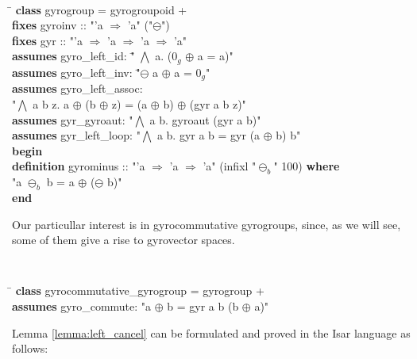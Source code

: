 \documentclass[a4paper]{article}
\newcommand{\tab}{\hspace{5mm}}
\theoremstyle{definition}
\begin{document}
\begin{small}
{\tt
\begin{tabbing}
\hspace{5mm}\=\kill
{\bf class}  gyrogroup  =  gyrogroupoid  +\\
\> {\bf fixes} gyroinv :: "'a $\Rightarrow$ 'a" ("$\ominus$")\\
\> {\bf fixes} gyr :: "'a $\Rightarrow$ 'a $\Rightarrow$ 'a $\Rightarrow$ 'a" \\
\> {\bf assumes} gyro\_left\_id: "\= $\bigwedge$ a. ($0_g$ $\oplus$ a = a)"\\
\> {\bf assumes} gyro\_left\_inv: "\=$\ominus$ a $\oplus$ a = $0_g$"\\
\> {\bf assumes} gyro\_left\_assoc: \\ \tab \tab "$\bigwedge$ a b z. a $\oplus$ (b $\oplus$ z) = (a $\oplus$ b) $\oplus$ (gyr a b z)"\\
\> {\bf assumes} gyr\_gyroaut: "$\bigwedge$ a b. gyroaut (gyr a b)"\\
\> {\bf assumes} gyr\_left\_loop: "$\bigwedge$ a b. gyr a b = gyr (a $\oplus$ b) b"\\
{\bf begin}\\[1mm]
{\bf definition} gyrominus :: "'a $\Rightarrow$ 'a $\Rightarrow$ 'a" (infixl "$\ominus_b$" 100) {\bf where}\\
\>    "a $\ominus_b$ b = a $\oplus$ ($\ominus$ b)"\\[1mm]
{\bf end}
\end{tabbing}
}
\end{small}


Our particullar interest is in gyrocommutative gyrogroups, since, as
we will see, some of them give a rise to gyrovector spaces.


\begin{small}
{\tt
\begin{tabbing}
\hspace{5mm}\=\kill
{\bf class} gyrocommutative\_gyrogroup = gyrogroup + \\
\> {\bf assumes}  gyro\_commute: "a $\oplus$ b = gyr a b (b $\oplus$ a)"
\end{tabbing}
}
\end{small}

Lemma \ref{lemma:left_cancel} can be formulated and proved in the Isar language as follows:
\end{document}
